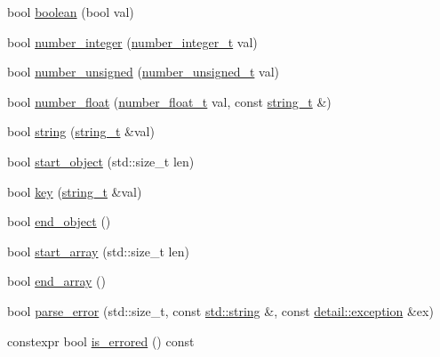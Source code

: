 \begin{DoxyCompactItemize}
\item 
bool \hyperlink{classnlohmann_1_1detail_1_1json__sax__dom__callback__parser_ab7d8db672189164a8c0731e65ada1b45}{boolean} (bool val)
\item 
bool \hyperlink{classnlohmann_1_1detail_1_1json__sax__dom__callback__parser_a68d9eddfd572e8687c1c8107e0505aa6}{number\+\_\+integer} (\hyperlink{classnlohmann_1_1detail_1_1json__sax__dom__callback__parser_a3ba8fc7a8d83c5b0eeb3b543ad844b8d}{number\+\_\+integer\+\_\+t} val)
\item 
bool \hyperlink{classnlohmann_1_1detail_1_1json__sax__dom__callback__parser_acabb231463bf669441c22e4ea385a9fb}{number\+\_\+unsigned} (\hyperlink{classnlohmann_1_1detail_1_1json__sax__dom__callback__parser_a2406c5125f7128fb9c01921df2903001}{number\+\_\+unsigned\+\_\+t} val)
\item 
bool \hyperlink{classnlohmann_1_1detail_1_1json__sax__dom__callback__parser_ae21f7872c334c77d03ae033cb0749b1c}{number\+\_\+float} (\hyperlink{classnlohmann_1_1detail_1_1json__sax__dom__callback__parser_a914ea0555cea5290449fb791ae41c655}{number\+\_\+float\+\_\+t} val, const \hyperlink{classnlohmann_1_1detail_1_1json__sax__dom__callback__parser_a00e7d95d82d5d8a43421526a42a8eabc}{string\+\_\+t} \&)
\item 
bool \hyperlink{classnlohmann_1_1detail_1_1json__sax__dom__callback__parser_ad94e912a67c7b96158937236805b8b47}{string} (\hyperlink{classnlohmann_1_1detail_1_1json__sax__dom__callback__parser_a00e7d95d82d5d8a43421526a42a8eabc}{string\+\_\+t} \&val)
\item 
bool \hyperlink{classnlohmann_1_1detail_1_1json__sax__dom__callback__parser_a040e60243cc7c18a6078c6b83cdb4a81}{start\+\_\+object} (std\+::size\+\_\+t len)
\item 
bool \hyperlink{classnlohmann_1_1detail_1_1json__sax__dom__callback__parser_a0cc4a5192fe9b803276edb831b6099fa}{key} (\hyperlink{classnlohmann_1_1detail_1_1json__sax__dom__callback__parser_a00e7d95d82d5d8a43421526a42a8eabc}{string\+\_\+t} \&val)
\item 
bool \hyperlink{classnlohmann_1_1detail_1_1json__sax__dom__callback__parser_ae75d313d6d1b9c29508e740a10fefa18}{end\+\_\+object} ()
\item 
bool \hyperlink{classnlohmann_1_1detail_1_1json__sax__dom__callback__parser_a5255b98ba8282e3625968f91cff9d3d0}{start\+\_\+array} (std\+::size\+\_\+t len)
\item 
bool \hyperlink{classnlohmann_1_1detail_1_1json__sax__dom__callback__parser_aa64e7a650952174037d32028de582c12}{end\+\_\+array} ()
\item 
bool \hyperlink{classnlohmann_1_1detail_1_1json__sax__dom__callback__parser_aac6e64f0b59c9150cde974e182d5ecab}{parse\+\_\+error} (std\+::size\+\_\+t, const \hyperlink{namespacenlohmann_1_1detail_a1ed8fc6239da25abcaf681d30ace4985ab45cffe084dd3d20d928bee85e7b0f21}{std\+::string} \&, const \hyperlink{classnlohmann_1_1detail_1_1exception}{detail\+::exception} \&ex)
\item 
constexpr bool \hyperlink{classnlohmann_1_1detail_1_1json__sax__dom__callback__parser_a167fd9bf385d3d08bcbbba8a927c0eff}{is\+\_\+errored} () const
\end{DoxyCompactItemize}
